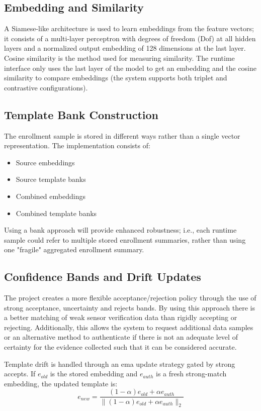 \subsection{Embedding and Similarity}
A Siamese-like architecture is used to learn embeddings from the feature vectors; it consists of a multi-layer perceptron with degrees of freedom (Dof) at all hidden layers and a normalized output embedding of 128 dimensions at the last layer. Cosine similarity is the method used for measuring similarity. The runtime interface only uses the last layer of the model to get an embedding and the cosine similarity to compare embeddings (the system supports both triplet and contrastive configurations).

\subsection{Template Bank Construction}
The enrollment sample is stored in different ways rather than a single vector representation. The implementation consists of:
\begin{itemize}
	\item Source embeddings
	\item Source template banks
	\item Combined embeddings
	\item Combined template banks
\end{itemize}
Using a bank approach will provide enhanced robustness; i.e., each runtime sample could refer to multiple stored enrollment summaries, rather than using one "fragile" aggregated enrollment summary.

\subsection{Confidence Bands and Drift Updates}
The project creates a more flexible acceptance/rejection policy through the use of strong acceptance, uncertainty and rejects bands. By using this approach there is a better matching of weak sensor verification data than rigidly accepting or rejecting.
Additionally, this allows the system to request additional data samples or an alternative method to authenticate if there is not an adequate level of certainty for the evidence collected such that it can be considered accurate.

Template drift is handled through an ema update strategy gated by strong accepts. If $e_{old}$ is the stored embedding and $e_{auth}$ is a fresh strong-match embedding, the updated template is:
\begin{equation}
e_{new} = \frac{(1-\alpha)e_{old} + \alpha e_{auth}}{\|(1-\alpha)e_{old} + \alpha e_{auth}\|_2}
\end{equation}

